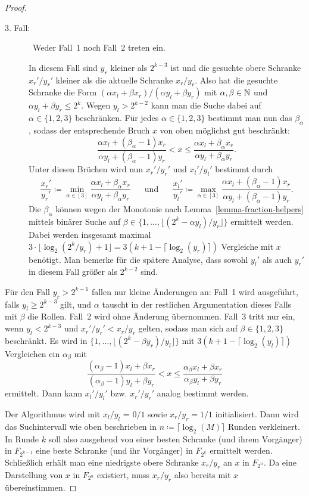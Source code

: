 \begin{proof}
\begin{description}
		\item[3. Fall:]~Weder Fall~1 noch Fall~2 treten ein.
		
			In diesem Fall sind $y_r$ kleiner als $2^{k-3}$ ist und die gesuchte obere Schranke $x_r'/y_r'$ kleiner als die aktuelle Schranke $x_r/y_r$.
			Also hat die gesuchte Schranke die Form $(\alpha x_l + \beta x_r)/(\alpha y_l + \beta y_r)$ mit $\alpha,\beta\in\mathbb{N}$ und $\alpha y_l + \beta y_r\leq 2^{k}$.
			Wegen $y_l > 2^{k-2}$ kann man die Suche dabei auf $\alpha \in \{ 1, 2, 3 \}$ beschränken.
			Für jedes $\alpha\in\{1,2,3\}$ bestimmt man nun das $\beta_\alpha$, sodass der entsprechende Bruch $x$ von oben möglichst gut beschränkt:
			\[
				\frac{\alpha x_l + (\beta_\alpha - 1) x_r}{\alpha y_l + (\beta_\alpha - 1) y_r} < x \leq \frac{\alpha x_l + \beta_\alpha x_r}{\alpha y_l + \beta_\alpha y_r}.
			\]
			Unter diesen Brüchen wird nun $x_r'/y_r'$ und $x_l'/y_l'$ bestimmt durch
			\[\frac{x_r'}{y_r'}\coloneq \min_{\alpha\in[3]} \frac{\alpha x_l + \beta_\alpha x_r}{\alpha y_l + \beta_\alpha y_r}
			\text{~~~~~und~~~~~}
			\frac{x_l'}{y_l'}\coloneq \max_{\alpha\in[3]} 			\frac{\alpha x_l + (\beta_\alpha - 1)x_r}{\alpha y_l + (\beta_\alpha - 1)y_r}.
			\]
			Die $\beta_\alpha$ können wegen der Monotonie nach Lemma~\ref{lemma-fraction-helpers} mittels binärer Suche auf $\beta \in \{1,\dots, \lfloor (2^{k} - \alpha y_l) / y_r \rfloor \}$ ermittelt werden.
			Dabei werden insgesamt maximal $3 \cdot \lfloor \log_2(2^{k} / y_r) + 1 \rfloor = 3 (k+1 - \lceil\log_2(y_r)\rceil)$ Vergleiche mit $x$ benötigt.
			Man bemerke für die spätere Analyse, dass sowohl $y_l'$ als auch $y_r'$ in diesem Fall größer als $2^{k-2}$ sind.
 	\end{description}
 
 	Für den Fall $y_r > 2^{k-1}$ fallen nur kleine Änderungen an:
 	Fall~1 wird ausgeführt, falls $y_l \geq 2^{k-3}$ gilt, und $\alpha$ tauscht in der restlichen Argumentation dieses Falls mit $\beta$ die Rollen.
 	Fall~2 wird ohne Änderung übernommen.
 	Fall~3 tritt nur ein, wenn $y_l<2^{k-3}$ und $x_r'/y_r' < x_r/y_r$ gelten, sodass man sich auf $\beta\in\{1, 2, 3\}$ beschränkt.
 	Es wird in $\{1,\dots, \lfloor ( 2^k - \beta y_r)/y_l \rfloor \}$ mit $3(k+1-\lceil \log_2(y_l) \rceil)$ Vergleichen ein $\alpha_\beta$ mit \[
 		\frac{(\alpha_\beta - 1) x_l + \beta x_r}{(\alpha_\beta - 1) y_l + \beta y_r} < x \leq \frac{\alpha_\beta x_l + \beta x_r}{\alpha_\beta y_l + \beta y_r}
 	\]
 	ermittelt.
 	Dann kann $x_l'/y_l'$ bzw. $x_r'/y_r'$ analog bestimmt werden.
 	
 	Der Algorithmus wird mit $x_l/y_l$ = $0/1$ sowie $x_r/y_r = 1/1$ initialisiert.
 	Dann wird das Suchintervall wie oben beschrieben in $n\coloneq \lceil \log_2(M) \rceil$ Runden verkleinert.
 	In Runde $k$ soll also ausgehend von einer besten Schranke (und ihrem Vorgänger) in $F_{2^{k-1}}$ eine beste Schranke (und ihr Vorgänger) in $F_{2^{k}}$ ermittelt werden.
 	Schließlich erhält man eine niedrigste obere Schranke $x_r/y_r$ an $x$ in $F_{2^n}$.
 	Da eine Darstellung von $x$ in $F_{2^n}$ existiert, muss $x_r/y_r$ also bereits mit $x$ übereinstimmen.
 	

\end{proof}
